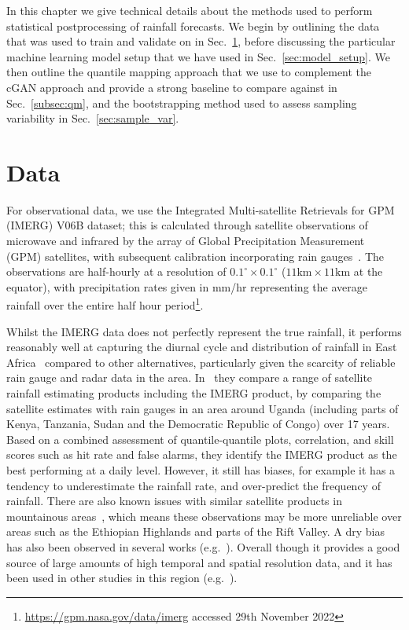 \documentclass[../main.tex]{subfiles}
\begin{document}
In this chapter we give technical details about the methods used to perform statistical postprocessing of rainfall forecasts. We begin by outlining the data that was used to train and validate on in Sec.~\ref{sec:data}, before discussing the particular machine learning model setup that we have used in Sec.~\ref{sec:model_setup}. We then outline the quantile mapping approach that we use to complement the cGAN approach and provide a strong baseline to compare against in Sec.~\ref{subsec:qm}, and the bootstrapping method used to assess sampling variability in Sec.~\ref{sec:sample_var}. 

\section{Data}
\label{sec:data}


For observational data, we use the Integrated Multi-satellite Retrievals for GPM (IMERG) V06B dataset; this is calculated through satellite observations of microwave and infrared by the array of Global Precipitation Measurement (GPM) satellites, with subsequent calibration incorporating rain gauges~\citep{huffman_nasa_2018}. The observations are half-hourly at a resolution of $0.1^{\circ} \times 0.1^{\circ}$ ($11\text{km} \times 11\text{km}$ at the equator), with precipitation rates given in mm/hr representing the average rainfall over the entire half hour period\footnote{\href{https://gpm.nasa.gov/data/imerg}{https://gpm.nasa.gov/data/imerg} accessed 29th November 2022}.


Whilst the IMERG data does not perfectly represent the true rainfall, it performs reasonably well at capturing the diurnal cycle and distribution of rainfall in East Africa~\citep{dezfuli_validation_2017, roca_comparing_2010, camberlin_major_2018} compared to other alternatives, particularly given the scarcity of reliable rain gauge and radar data in the area.  In~\cite{ageet_validation_2022} they compare a range of satellite rainfall estimating products including the IMERG product, by comparing the satellite estimates with rain gauges in an area around Uganda (including parts of Kenya, Tanzania, Sudan and the Democratic Republic of Congo) over 17 years. Based on a combined assessment of quantile-quantile plots, correlation, and skill scores such as hit rate and false alarms, they identify the IMERG product as the best performing at a daily level. However, it still has biases, for example it has a tendency to underestimate the rainfall rate, and over-predict the frequency of rainfall. There are also known issues with similar satellite products in mountainous areas~\citep{dinku_comparison_2010}, which means these observations may be more unreliable over areas such as the Ethiopian Highlands and parts of the Rift Valley. A dry bias has also been observed in several works (e.g.~\cite{vogel_skill_2018}). Overall though it provides a good source of large amounts of high temporal and spatial resolution data, and it has been used in other studies in this region (e.g.~\cite{woodhams_what_2018, finney_implications_2019, cafaro_convection-permitting_2021}).
\end{document}
